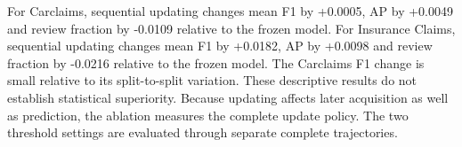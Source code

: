 For Carclaims, sequential updating changes mean F1 by +0.0005, AP by +0.0049 and review fraction by -0.0109 relative to the frozen model. For Insurance Claims, sequential updating changes mean F1 by +0.0182, AP by +0.0098 and review fraction by -0.0216 relative to the frozen model. The Carclaims F1 change is small relative to its split-to-split variation. These descriptive results do not establish statistical superiority. Because updating affects later acquisition as well as prediction, the ablation measures the complete update policy. The two threshold settings are evaluated through separate complete trajectories.
